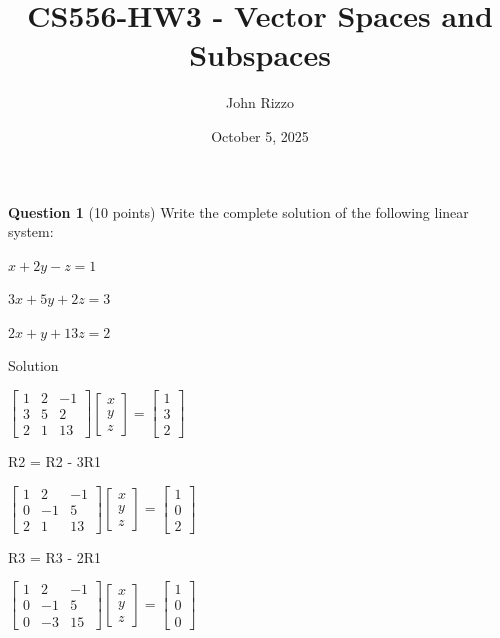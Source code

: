 \documentclass{article}
\title{CS556-HW3 - Vector Spaces and Subspaces}
\author{John Rizzo}
\date{October 5, 2025}
\begin{document}
\maketitle
\noindent
\textbf{Question 1} (10 points) Write the complete solution of the following linear system:

$x + 2y - z = 1$

$3x + 5y + 2z = 3$

$2x + y + 13z = 2$

Solution 

$\begin{bmatrix}
1 & 2 & -1 \\
3 & 5 & 2\\
2 & 1 & 13
\end{bmatrix}\begin{bmatrix}
x \\ y \\ z    
\end{bmatrix} = \begin{bmatrix}
    1 \\ 3 \\ 2
\end{bmatrix}$

R2 = R2 - 3R1

$\begin{bmatrix}
1 & 2 & -1 \\
0 & -1 & 5\\
2 & 1 & 13
\end{bmatrix}\begin{bmatrix}
x \\ y \\ z    
\end{bmatrix} = \begin{bmatrix}
    1 \\ 0 \\ 2
\end{bmatrix}$ 

 R3 = R3 - 2R1

$\begin{bmatrix}
1 & 2 & -1 \\
0 & -1 & 5\\
0 & -3 & 15
\end{bmatrix}\begin{bmatrix}
x \\ y \\ z    
\end{bmatrix} = \begin{bmatrix}
    1 \\ 0 \\ 0
\end{bmatrix}$
\end{document}

